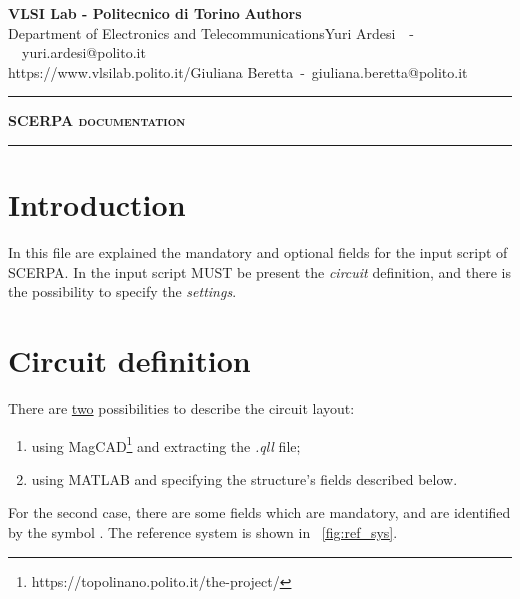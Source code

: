\documentclass[a4paper,10pt]{article}
\makeatletter
\newcommand{\myName}{Giuliana Beretta}
\newcommand{\myEmail}{giuliana.beretta@polito.it}
\newcommand{\myColleagueName}{Yuri Ardesi}
\newcommand{\myColleagueEmail}{yuri.ardesi@polito.it}
\newcommand{\myTitle}{SCERPA documentation}
\newcommand{\VLSItitle}{VLSI Lab - Politecnico di Torino}
\newcommand{\VLSIdep}{Department of Electronics and Telecommunications}
\newcommand{\VLSIurl}{https://www.vlsilab.polito.it/}
\newcommand{\authorTitle}{Authors}
\makeatother
\begin{document}
\usebox{\myLogos}
\vspace{0.3in} %

\begin{center}
	\begin{minipage}{\textwidth}
		\begin{flushleft}
			\textbf{\VLSItitle} \hfill \textbf{\authorTitle}\\
			\VLSIdep \hfill \myColleagueName~~-~~\myColleagueEmail\\
			\VLSIurl \hfill \myName~-~\myEmail\\
		\end{flushleft}
	\end{minipage}
\end{center}
{\centering \noindent\rule{\textwidth}{0.4pt} \par}


\vspace{1.3cm}
{\centering \Huge \textbf{\textsc{\myTitle}} \par}
\vspace{1.3cm}
{\centering \noindent\rule{\textwidth}{0.4pt} \par}
\vspace{1.3cm}

\section{Introduction}
\noindent In this file are explained the mandatory and optional fields for the input script of SCERPA. 
In the input script MUST be present the \textit{circuit} definition, and there is the possibility to specify the \textit{settings}.

\section{Circuit definition}
\noindent There are \underline{two} possibilities to describe the circuit layout:
\begin{enumerate}
\item using MagCAD\footnote{https://topolinano.polito.it/the-project/} and extracting the \textit{.qll} file;
\item using MATLAB and specifying the structure's fields described below.
\end{enumerate}

\noindent For the second case, there are some fields which are mandatory, and are identified by the symbol \danger . The reference system is shown in \figurename~\ref{fig:ref_sys}.
\end{document}
